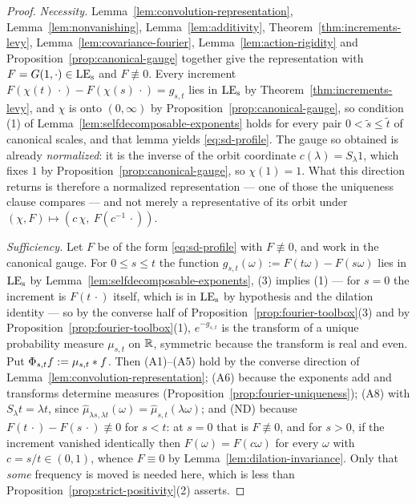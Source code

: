 \begin{proof}
\emph{Necessity.} Lemma~\ref{lem:convolution-representation}, Lemma~\ref{lem:nonvanishing},
Lemma~\ref{lem:additivity}, Theorem~\ref{thm:increments-levy},
Lemma~\ref{lem:covariance-fourier}, Lemma~\ref{lem:action-rigidity} and
Proposition~\ref{prop:canonical-gauge} together give the representation with
$F = G(1,\cdot) \in \mathrm{LE}_{\mathrm{s}}$ and $F \not\equiv 0$. Every increment
$F(\chi(t)\,\cdot) - F(\chi(s)\,\cdot) = g_{s,t}$ lies in $\mathrm{LE}_{\mathrm{s}}$ by
Theorem~\ref{thm:increments-levy}, and $\chi$ is onto $(0,\infty)$ by
Proposition~\ref{prop:canonical-gauge}, so condition (1) of
Lemma~\ref{lem:selfdecomposable-exponents} holds for every pair $0 < \tilde s \le \tilde t$ of
canonical scales, and that lemma yields \ref{eq:sd-profile}. The gauge so obtained is already
\emph{normalized}: it is the inverse of the orbit coordinate $c(\lambda) = S_\lambda 1$, which
fixes $1$ by Proposition~\ref{prop:canonical-gauge}, so $\chi(1) = 1$. What this direction
returns is therefore a normalized representation --- one of those the uniqueness clause
compares --- and not merely a representative of its orbit under
$(\chi,F) \mapsto (c\,\chi,\ F(c^{-1}\,\cdot))$.

\emph{Sufficiency.} Let $F$ be of the form \ref{eq:sd-profile} with $F \not\equiv 0$, and work
in the canonical gauge. For $0 \le s \le t$ the function
$g_{s,t}(\omega) := F(t\omega) - F(s\omega)$ lies in $\mathrm{LE}_{\mathrm{s}}$ by
Lemma~\ref{lem:selfdecomposable-exponents}, (3) implies (1) --- for $s = 0$ the increment is
$F(t\,\cdot)$ itself, which is in $\mathrm{LE}_{\mathrm{s}}$ by hypothesis and the dilation identity --- so by the
converse half of Proposition~\ref{prop:fourier-toolbox}(3) and by
Proposition~\ref{prop:fourier-toolbox}(1), $e^{-g_{s,t}}$ is the transform of a unique
probability measure $\mu_{s,t}$ on $\mathbb{R}$, symmetric because the transform is real and even.
Put $\Phi_{s,t}f := \mu_{s,t} * f$. Then (A1)--(A5) hold by the converse direction of
Lemma~\ref{lem:convolution-representation}; (A6) because the exponents add and transforms
determine measures (Proposition~\ref{prop:fourier-uniqueness}); (A8) with
$S_\lambda t = \lambda t$, since $\hat\mu_{\lambda s,\lambda t}(\omega) =
\hat\mu_{s,t}(\lambda\omega)$; and (ND) because $F(t\,\cdot) - F(s\,\cdot) \not\equiv 0$ for
$s < t$: at $s = 0$ that is $F \not\equiv 0$, and for $s > 0$, if the increment vanished
identically then $F(\omega) = F(c\omega)$ for every $\omega$ with $c = s/t \in (0,1)$, whence
$F \equiv 0$ by Lemma~\ref{lem:dilation-invariance}. Only that \emph{some} frequency is moved
is needed here, which is less than Proposition~\ref{prop:strict-positivity}(2) asserts.


\end{proof}
